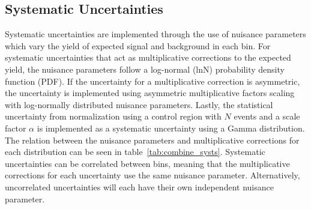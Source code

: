 \subsection{Systematic Uncertainties} \label{sec:ana_systs}
Systematic uncertainties are implemented through the use of nuisance parameters which vary the yield of expected signal and background in each bin. For systematic uncertainties that act as multiplicative corrections to the expected yield, the nuisance parameters follow a log-normal (lnN) probability density function (PDF). If the uncertainty for a multiplicative correction is asymmetric, the uncertainty is implemented using asymmetric multiplicative factors scaling with log-normally distributed nuisance parameters. Lastly, the statistical uncertainty from normalization using a control region with $N$ events and a scale factor $\alpha$ is implemented as a systematic uncertainty using a Gamma distribution. The relation between the nuisance parameters and multiplicative corrections for each distribution can be seen in table~\ref{tab:combine_systs}. Systematic uncertainties can be correlated between bins, meaning that the multiplicative corrections for each uncertainty use the same nuisance parameter. Alternatively, uncorrelated uncertainties will each have their own independent nuisance parameter.


